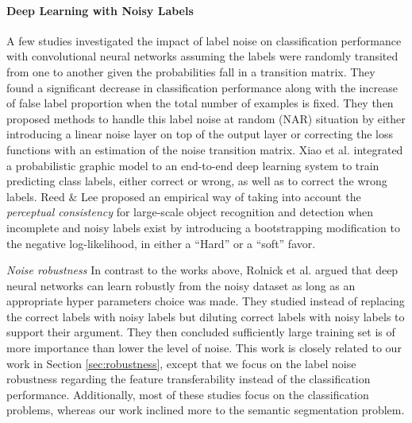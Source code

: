 \paragraph{{Deep Learning with Noisy Labels}}
A few studies\cite{sukhbaatar2014training,patrini2016making} investigated the impact of label noise on classification performance with convolutional neural networks assuming the labels were randomly transited from one to another given the probabilities fall in a transition matrix.
They found a significant decrease in classification performance along with the increase of false label proportion when the total number of examples is fixed.
They then proposed methods to handle this label noise at random (NAR)\cite{frenay2014classification} situation by either introducing a linear noise layer on top of the output layer\cite{sukhbaatar2014training} or correcting the loss functions with an estimation of the noise transition matrix\cite{patrini2016making}.
Xiao et al.\cite{xiao2015learning} integrated a probabilistic graphic model to an end-to-end deep learning system to train predicting class labels, either correct or wrong, as well as to correct the wrong labels.
Reed \& Lee\cite{reed2014training} proposed an empirical way of taking into account the \textit{perceptual consistency} for large-scale object recognition and detection when incomplete and noisy labels exist by introducing a bootstrapping modification to the negative log-likelihood, in either a ``Hard'' or a ``soft'' favor.

\textit{Noise robustness}
In contrast to the works above, Rolnick et al.\cite{rolnick2017deep} argued that deep neural networks can learn robustly from the noisy dataset as long as an appropriate hyper parameters choice was made.
They studied instead of replacing the correct labels with noisy labels but diluting correct labels with noisy labels to support their argument.
They then concluded sufficiently large training set is of more importance than lower the level of noise.
This work is closely related to our work in Section \ref{sec:robustness}, except that we focus on the label noise robustness regarding the feature transferability instead of the classification performance.
Additionally, most of these studies focus on the classification problems, whereas our work inclined more to the semantic segmentation problem.

